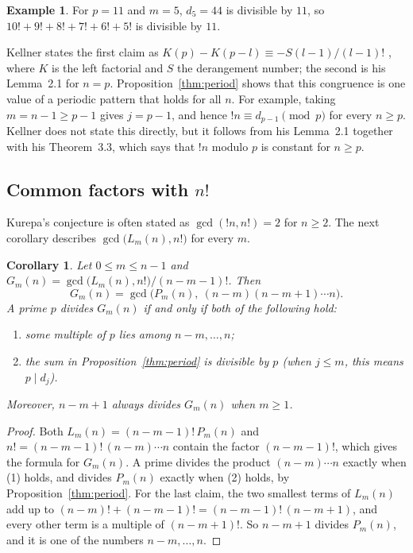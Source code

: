 \documentclass[11pt]{amsart}
\theoremstyle{plain}
\newtheorem{corollary}[theorem]{Corollary}
\theoremstyle{definition}
\newtheorem{example}[theorem]{Example}
\theoremstyle{remark}
\begin{document}
\begin{example}
For $p=11$ and $m=5$, $d_5=44$ is divisible by $11$, so
$10!+9!+8!+7!+6!+5!$ is divisible by $11$.
\end{example}

Kellner states the first claim as $K(p)-K(p-l)\equiv-S(l-1)/(l-1)!$
\cite[Lemma~2.4]{Kellner}, where $K$ is the left factorial and $S$ the
derangement number; the second is his Lemma~2.1 for $n=p$.
Proposition~\ref{thm:period} shows that this congruence is one value of a
periodic pattern that holds for all $n$. For example, taking $m=n-1\ge p-1$
gives $j=p-1$, and hence $!n\equiv d_{p-1}\pmod p$ for every $n\ge p$.
Kellner does not state this directly, but it follows from his Lemma~2.1
together with his Theorem~3.3, which says that $!n$ modulo $p$ is constant for
$n\ge p$.

\subsection{\texorpdfstring{Common factors with $n!$}{Common factors with n!}}
Kurepa's conjecture is often stated as $\gcd(!n,n!)=2$ for $n\ge2$. The next
corollary describes $\gcd\bigl(L_m(n),n!\bigr)$ for every $m$.

\begin{corollary}\label{cor:gcd}
Let $0\le m\le n-1$ and $G_m(n)=\gcd\bigl(L_m(n),n!\bigr)/(n-m-1)!$. Then
\[
  G_m(n)=\gcd\bigl(P_m(n),\ (n-m)(n-m+1)\cdots n\bigr).
\]
A prime $p$ divides $G_m(n)$ if and only if both of the following hold:
\begin{enumerate}
  \item some multiple of $p$ lies among $n-m,\dots,n$;
  \item the sum in Proposition~\ref{thm:period} is divisible by $p$ (when $j\le m$,
        this means $p\mid d_j$).
\end{enumerate}
Moreover, $n-m+1$ always divides $G_m(n)$ when $m\ge1$.
\end{corollary}

\begin{proof}
Both $L_m(n)=(n-m-1)!\,P_m(n)$ and $n!=(n-m-1)!\,(n-m)\cdots n$ contain the
factor $(n-m-1)!$, which gives the formula for $G_m(n)$. A prime divides the
product $(n-m)\cdots n$ exactly when (1) holds, and divides $P_m(n)$ exactly
when (2) holds, by Proposition~\ref{thm:period}. For the last claim, the two
smallest terms of $L_m(n)$ add up to $(n-m)!+(n-m-1)!=(n-m-1)!\,(n-m+1)$, and
every other term is a multiple of $(n-m+1)!$. So $n-m+1$ divides $P_m(n)$, and
it is one of the numbers $n-m,\dots,n$.
\end{proof}
\end{document}
